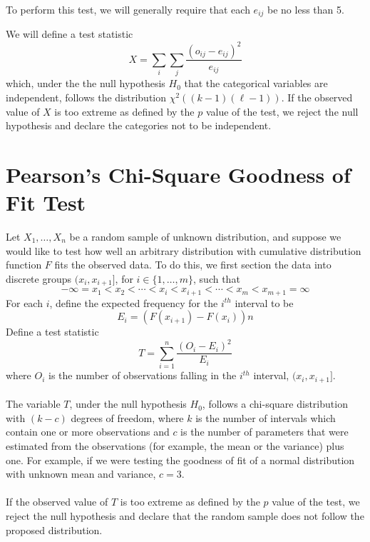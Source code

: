 \documentclass[1pt]{report}
\newcommand{\<}{\langle}
\renewcommand{\>}{\rangle}
\begin{document}
\begin{rmkbox}
To perform this test, we will generally require that each $e_{ij}$ be no less than 5.
\end{rmkbox}
We will define a test statistic 
$$X = \sum\limits_i \sum\limits_j\dfrac{(o_{ij} - e_{ij})^2}{e_{ij}}$$
which, under the the null hypothesis $H_0$ that the categorical variables are independent, follows the distribution $\chi^2\left((k-1)(\ell-1)\right)$. If the observed value of $X$ is too extreme as defined by the $p$ value of the test, we reject the null hypothesis and declare the categories not to be independent.
\section{Pearson's Chi-Square Goodness of Fit Test}
Let $X_1, \dots, X_n$ be a random sample of unknown distribution, and suppose we would like to test how well an arbitrary distribution with cumulative distribution function $F$ fits the observed data. To do this, we first section the data into discrete groups $(x_i, x_{i+1}]$, for $i \in \{1,\dots, m\}$, such that 
$$-\infty = x_1 < x_2 < \cdots < x_i < x_{i+1} < \cdots < x_{m} < x_{m+1} = \infty$$
For each $i$, define the expected frequency for the $i^{th}$ interval to be 
$$E_i = \left(F\left(x_{i+1}\right) - F\left(x_i\right)\right)n$$
Define a test statistic 
$$T = \sum\limits_{i=1}^n \dfrac{ \left(O_i - E_i\right)^2}{E_i}$$
where $O_i$ is the number of observations falling in the $i^{th}$ interval, $(x_i, x_{i+1}]$.\\
\\
The variable $T$, under the null hypothesis $H_0$, follows a chi-square distribution with $(k-c)$ degrees of freedom, where $k$ is the number of intervals which contain one or more observations and $c$ is the number of parameters that were estimated from the observations (for example, the mean or the variance) plus one. For example, if we were testing the goodness of fit of a normal distribution with unknown mean and variance, $c = 3$. \\
\\
If the observed value of $T$ is too extreme as defined by the $p$ value of the test, we reject the null hypothesis and declare that the random sample does not follow the proposed distribution.
\end{document}
